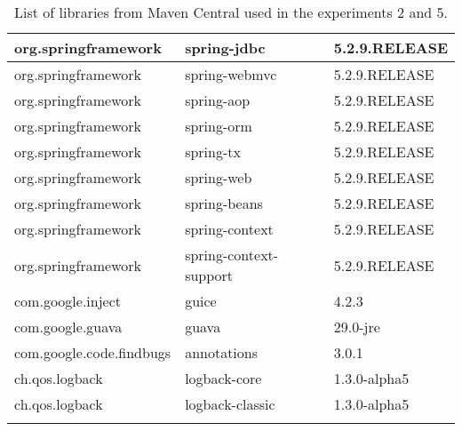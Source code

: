 \begin{appendices}
\begin{longtable}[h]{|l|l|l|}
  org.springframework & spring-jdbc & 5.2.9.RELEASE \\ \hline
  org.springframework & spring-webmvc & 5.2.9.RELEASE \\ \hline
  org.springframework & spring-aop & 5.2.9.RELEASE \\ \hline
  org.springframework & spring-orm & 5.2.9.RELEASE \\ \hline
  org.springframework & spring-tx & 5.2.9.RELEASE \\ \hline
  org.springframework & spring-web & 5.2.9.RELEASE \\ \hline
  org.springframework & spring-beans & 5.2.9.RELEASE \\ \hline
  org.springframework & spring-context & 5.2.9.RELEASE \\ \hline
  org.springframework & spring-context-support & 5.2.9.RELEASE \\ \hline
  com.google.inject & guice & 4.2.3 \\ \hline
  com.google.guava & guava & 29.0-jre \\ \hline
  com.google.code.findbugs & annotations & 3.0.1 \\ \hline
  ch.qos.logback & logback-core & 1.3.0-alpha5 \\ \hline
  ch.qos.logback & logback-classic & 1.3.0-alpha5 \\ \hline
  \caption{List of libraries from Maven Central used in the experiments 2 and 5.}
  \label{table:data-set}
\end{longtable}

\end{appendices}
